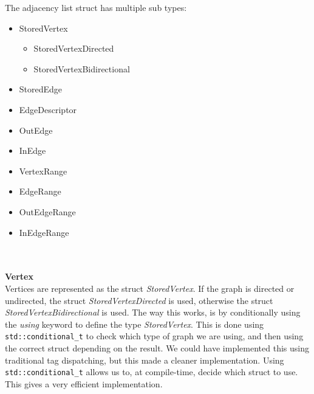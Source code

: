 \documentclass{article}
\begin{document}
The adjacency list struct has multiple sub types: 
\begin{itemize}
    \item StoredVertex
    \begin{itemize}
    \item StoredVertexDirected
    \item StoredVertexBidirectional
    \end{itemize}
    \item StoredEdge
    \item EdgeDescriptor
    \item OutEdge
    \item InEdge
    \item VertexRange
    \item EdgeRange
    \item OutEdgeRange
    \item InEdgeRange
\end{itemize}
\\\\
\noindent
\textbf{Vertex}\\
Vertices are represented as the struct \textit{StoredVertex}. If the graph is directed or undirected, the struct \textit{StoredVertexDirected} is used, otherwise the struct \textit{StoredVertexBidirectional} is used. 
The way this works, is by conditionally using the \textit{using} keyword to define the type \textit{StoredVertex}.
This is done using \texttt{std::conditional\_t} to check which type of graph we are using, and then using the correct struct depending on the result.
We could have implemented this using traditional tag dispatching, but this made a cleaner implementation.
Using \texttt{std::conditional\_t} allows us to, at compile-time, decide which struct to use. This gives a very efficient implementation.
\end{document}
